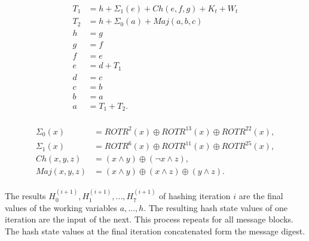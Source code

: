 \begin{align}
    \begin{split}
        T_1 &= h + \Sigma_1(e) + Ch(e,f,g) + K_{t} + W_{t} \\
        T_2 &= h + \Sigma_0(a) + Maj(a,b,c) \\
        h &= g \\
        g &= f \\
        f &= e \\
        e &= d + T_1 \\
        d &= c \\
        c &= b \\
        b &= a \\
        a &= T_1 + T_2.
    \end{split}
\label{eq:hash_iter}
\end{align}

\begin{align}
    \begin{split}
        \Sigma_{0}(x) &= ROTR^{2}(x) \oplus ROTR^{13}(x) \oplus ROTR^{22}(x), \\
        \Sigma_{1}(x) &= ROTR^{6}(x) \oplus ROTR^{11}(x) \oplus ROTR^{25}(x), \\
        Ch(x,y,z) &= (x \land y) \oplus ( \neg x \land z), \\
        Maj(x,y,z) &= (x \land y) \oplus (x \land z) \oplus (y \land z).
    \end{split}
\label{eq:Sigma_Ch_Maj}
\end{align}

The results $H_{0}^{(i+1)}, H_{1}^{(i+1)},..., H_{7}^{(i+1)}$ of hashing
iteration $i$ are the final values of the working variables $a,..., h$.
The resulting hash state values of one iteration are the input of the next.
This process repeats for all message blocks. The hash state values at the final
iteration concatenated form the message digest.


